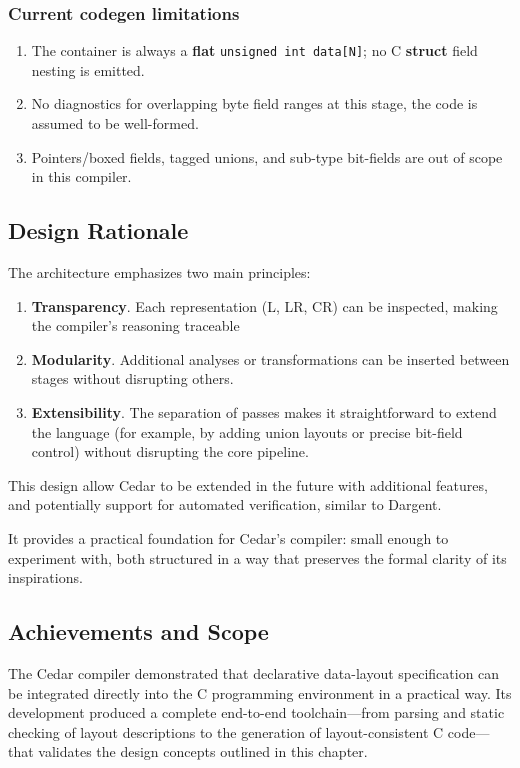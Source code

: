 \subsubsection{Current codegen limitations}
\begin{enumerate}
    \item The container is always a \textbf{flat} \texttt{unsigned int data[N]}; no C \textbf{struct} field nesting is emitted.
    \item No diagnostics for overlapping byte field ranges at this stage, the code is assumed to be well-formed.
    \item Pointers/boxed fields, tagged unions, and sub-type bit-fields are out of scope in this compiler.
\end{enumerate}

\subsection{Design Rationale}
The architecture emphasizes two main principles:
\begin{enumerate}
    \item \textbf{Transparency}. Each representation (L, LR, CR) can
    be inspected, making the compiler's reasoning traceable
    \item \textbf{Modularity}. Additional analyses or transformations
    can be inserted between stages without disrupting others.
    \item \textbf{Extensibility}. The separation of passes makes it straightforward
    to extend the language (for example, by adding union layouts or precise bit-field control)
    without disrupting the core pipeline.
\end{enumerate}

This design allow Cedar to be extended in the future with
additional features, and potentially support for automated
verification, similar to Dargent.

It provides a practical foundation for Cedar's compiler: small enough
to experiment with, both structured in a way that preserves the formal
clarity of its inspirations.


\subsection{Achievements and Scope}
The Cedar compiler demonstrated that declarative data-layout specification
can be integrated directly into the C programming environment in a practical
way.
Its development produced a complete end-to-end toolchain—from parsing and static
checking of layout descriptions to the generation of layout-consistent C
code—that validates the design concepts outlined in this chapter.

